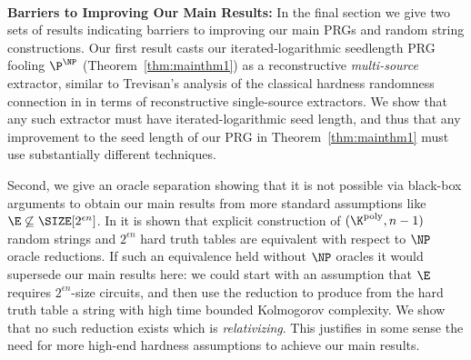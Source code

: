 \documentclass[11pt]{article}
\renewcommand{\poly}{\mathrm{poly}}
\begin{document}


~\\
{\bf \noindent Barriers to Improving Our Main Results:} 
In the final section we give two sets of results indicating barriers to improving our main PRGs and random string constructions. Our first result casts our iterated-logarithmic seedlength PRG fooling $\P^{\NP}$ (Theorem~\ref{thm:mainthm1}) as a reconstructive \emph{multi-source} extractor, similar to Trevisan's analysis \cite{trevisan} of the classical hardness randomness connection in \cite{NW94,IW97} in terms of reconstructive single-source extractors. We show that any such extractor must have iterated-logarithmic seed length, and thus that any improvement to the seed length of our PRG in Theorem~\ref{thm:mainthm1} must use substantially different techniques.

Second, we give an oracle separation showing that it is not possible via black-box arguments to obtain our main results from more standard assumptions like $\E \not\subseteq \SIZE[2^{\epsilon n}]$. In \cite{Korten21} it is shown that explicit construction of $(\K^{\poly},n-1)$ random strings and $2^{\epsilon n}$ hard truth tables are equivalent with respect to $\NP$ oracle reductions. If such an equivalence held without $\NP$ oracles it would supersede our main results here: we could start with an assumption that $\E$ requires $2^{\epsilon n}$-size circuits, and then use the reduction to produce from the hard truth table a string with high time bounded Kolmogorov complexity. We show that no such reduction exists which is \emph{relativizing}. This justifies in some sense the need for more high-end hardness assumptions to achieve our main results. 

\end{document}
